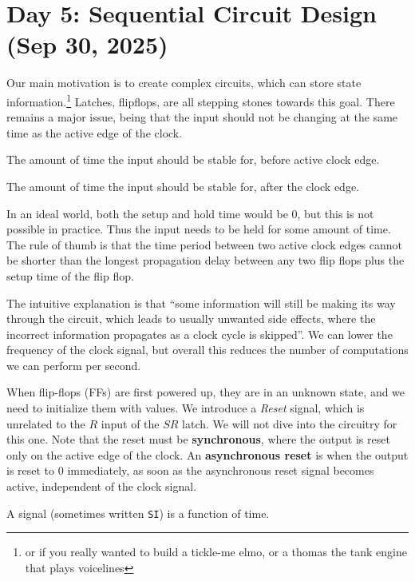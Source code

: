\section{Day 5: Sequential Circuit Design (Sep 30, 2025)}

Our main motivation is to create complex circuits, which can store state information.\footnote{or if you really wanted to build a tickle-me elmo, or a thomas the tank engine that plays voicelines} Latches, flipflops, are all stepping stones towards this goal. There remains a major issue, being that the input should not be changing at the same time as the active edge of the clock.

\begin{definition}
The amount of time the input should be stable for, before active clock edge.
\end{definition}

\begin{definition}
The amount of time the input should be stable for, after the clock edge.
\end{definition}

In an ideal world, both the setup and hold time would be 0, but this is not possible in practice. Thus the input needs to be held for some amount of time. The rule of thumb is that the time period between two active clock edges cannot be shorter than the longest propagation delay between any two flip flops plus the setup time of the flip flop.

The intuitive explanation is that ``some information will still be making its way through the circuit, which leads to usually unwanted side effects, where the incorrect information propagates as a clock cycle is skipped''. We can lower the frequency of the clock signal, but overall this reduces the number of computations we can perform per second.

When flip-flops (FFs) are first powered up, they are in an unknown state, and we need to initialize them with values. We introduce a \textit{Reset} signal, which is unrelated to the $R$ input of the $SR$ latch. We will not dive into the circuitry for this one. Note that the reset must be \textbf{synchronous}, where the output is reset only on the active edge of the clock. An \textbf{asynchronous reset} is when the output is reset to 0 immediately, as soon as the asynchronous reset signal becomes active, independent of the clock signal.

\begin{definition}[Signal]
    A signal (sometimes written \texttt{SI}) is a function of time.
\end{definition}

